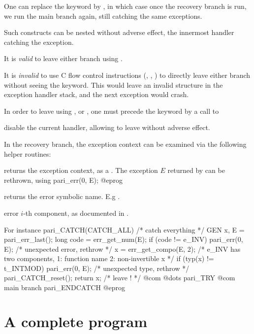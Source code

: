 One can replace the  keyword by , in which case
once the recovery branch is run, we run the main branch again, still catching
the same exceptions.


\item Such constructs can be nested without adverse effect, the innermost
handler catching the exception.

\item It is \emph{valid} to leave either branch using .

\item It is \emph{invalid} to use C flow control instructions (,
, ) to directly leave either branch without seeing
the  keyword. This would leave an invalid structure in the
exception handler stack, and the next exception would crash.

\item In order to leave using ,  or ,
one must precede the keyword by a call to

 disable the current handler, allowing to leave
without adverse effect.


In the recovery branch, the exception context can be examined via the
following helper routines:

 returns the exception context, as a .
The exception $E$ returned by  can be rethrown, using
\bprog
  pari_err(0, E);
@eprog

 returns the error symbolic name. E.g
.

 error $i$-th component, as documented
in .

\noindent For instance
\bprog
 pari_CATCH(CATCH_ALL) { /* catch everything */
    GEN x, E = pari_err_last();
    long code = err_get_num(E);
    if (code != e_INV) pari_err(0, E); /* unexpected error, rethrow */
    x = err_get_compo(E, 2);
    /* e_INV has two components, 1: function name 2: non-invertible x */
    if (typ(x) != t_INTMOD) pari_err(0, E); /* unexpected type, rethrow */
    pari_CATCH_reset();
    return x; /* leave ! */
    @com @dots
 } pari_TRY {
   @com main branch
 }
 pari_ENDCATCH
@eprog

\section{A complete program}
\label{se:prog}

